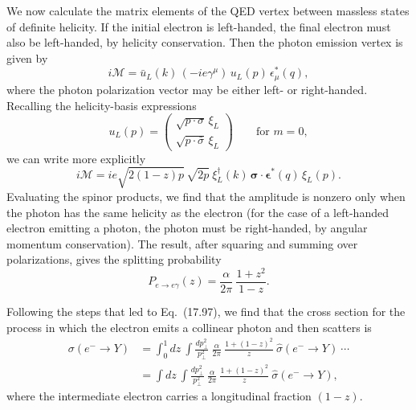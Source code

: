 We now calculate the matrix elements of the QED vertex between massless
states of definite helicity.  If the initial electron is left-handed, the
final electron must also be left-handed, by helicity conservation.  Then the
photon emission vertex is given by
\begin{equation}
  i\mathcal{M} = \bar{u}_L(k)\,(-ie\gamma^\mu)\,u_L(p)\,
    \epsilon^{*}_\mu(q) ,
  \label{eq:17.86}
\end{equation}
where the photon polarization vector may be either left- or right-handed.
Recalling the helicity-basis expressions
\begin{equation}
  u_L(p) = \begin{pmatrix}\sqrt{p\cdot\sigma}\,\xi_L\\ \sqrt{p\cdot
    \bar{\sigma}}\,\xi_L\end{pmatrix}
  \qquad\text{for } m = 0 ,
\end{equation}
we can write more explicitly
\begin{equation}
  i\mathcal{M} = ie\sqrt{2(1-z)p}\,\sqrt{2p}\ \xi^{\dagger}_L(k)\,
    \bm{\sigma}\cdot\bm{\epsilon}^{*}(q)\,\xi_L(p) .
  \label{eq:17.87}
\end{equation}
Evaluating the spinor products, we find that the amplitude is nonzero only
when the photon has the same helicity as the electron (for the case of a
left-handed electron emitting a photon, the photon must be right-handed, by
angular momentum conservation).  The result, after squaring and summing over
polarizations, gives the splitting probability
\begin{equation}
  P_{e\to e\gamma}(z) = \frac{\alpha}{2\pi}\ \frac{1+z^2}{1-z} .
\end{equation}

Following the steps that led to Eq.~(17.97), we find that the cross
section for the process in which the electron emits a collinear photon and
then scatters is
\begin{equation}
  \begin{aligned}
    \sigma(e^{-}\to Y) &= \int_0^1 dz\ \int \frac{dp_\perp^2}{p_\perp^2}\
      \frac{\alpha}{2\pi}\ \frac{1+(1-z)^2}{z}\ \hat{\sigma}(e^{-} \to Y)
      \ \cdots\\
    &= \int dz\ \int \frac{dp_\perp^2}{p_\perp^2}\ \frac{\alpha}{2\pi}\
      \frac{1+(1-z)^2}{z}\ \hat{\sigma}(e^{-} \to Y) ,
  \end{aligned}
  \label{eq:17.99}
\end{equation}
where the intermediate electron carries a longitudinal fraction $(1-z)$.

